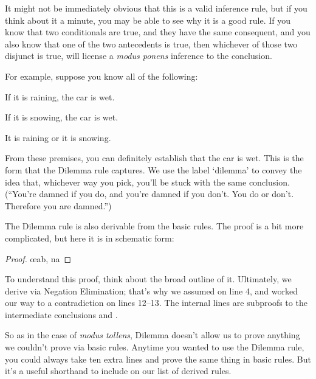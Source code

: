 It might not be immediately obvious that this is a valid inference rule, but if you think about it a minute, you may be able to see why it is a good rule. If you know that two conditionals are true, and they have the same consequent, and you also know that one of the two antecedents is true, then whichever of those two disjunct is true, will license a \emph{modus ponens} inference to the conclusion.

For example, suppose you know all of the following:

\begin{earg}
\item[] If it is raining, the car is wet.
\item[] If it is snowing, the car is wet.
\item[] It is raining or it is snowing.
\end{earg}

From these premises, you can definitely establish that the car is wet. This is the form that the Dilemma rule captures. We use the label `dilemma' to convey the idea that, whichever way you pick, you'll be stuck with the same conclusion. (``You're damned if you do, and you're damned if you don't. You do or don't. Therefore you are damned.'')

The Dilemma rule is also derivable from the basic rules. The proof is a bit more complicated, but here it is in schematic form:

\begin{proof}
	\open
		\open
			\metaA{}
		\close
		\open
			\metaB{}
		\close
		\metaB{}\oe{ab, na}
	\close
	 
\end{proof}

To understand this proof, think about the broad outline of it. Ultimately, we derive \metaC{} via Negation Elimination; that's why we assumed \enot\metaC{} on line 4, and worked our way to a contradiction on lines 12--13. The internal lines are subproofs to the intermediate conclusions \metaB{} and \enot\metaB{}.

So as in the case of \emph{modus tollens}, Dilemma doesn't allow us to prove anything we couldn't prove via basic rules. Anytime you wanted to use the Dilemma rule, you could always take ten extra lines and prove the same thing in basic rules. But it's a useful shorthand to include on our list of derived rules.

